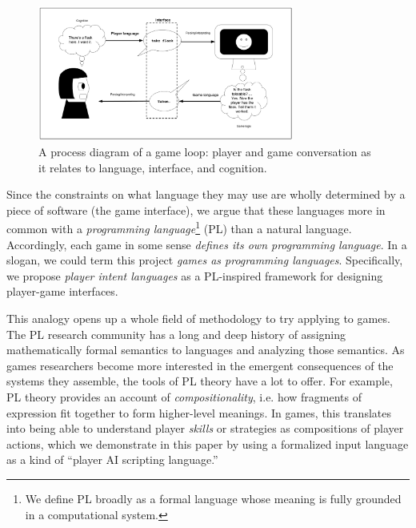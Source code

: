 \documentclass[sigconf]{acmart}
\begin{document}
\begin{figure}
\includegraphics[width=0.75\textwidth]{conversation-processing.png}
\caption{A process diagram of a game loop: player and game conversation as
it relates to language, interface, and cognition.}
\label{fig:gameloop}
\end{figure}

Since the constraints on what
language they may use are wholly determined by a piece of software (the
game interface), we argue that these languages more in common with a {\em
programming language}\footnote{We define PL broadly as a formal language whose meaning
is fully grounded in a computational system.} (PL) than a natural language. 
Accordingly, each game in some sense {\em defines its own programming
language}. In a slogan, we could term this project {\em games as
programming languages}.
%
Specifically, we propose \emph{player intent languages} as a
PL-inspired framework for designing player-game interfaces.


This analogy opens up a whole field of methodology to try applying to
games.  The PL research community has a long and deep
history of assigning mathematically formal semantics to languages and
analyzing those semantics. As games researchers become more interested in
the emergent consequences of the systems they assemble, the tools of PL
theory have a lot to offer. For example, PL theory provides an account of
{\em compositionality}, i.e. how fragments of expression fit together to
form higher-level meanings. In games, this translates into being able to
understand player {\em skills} or strategies as compositions of player
actions, which we demonstrate in this paper by using a formalized input
language as a kind of ``player AI scripting language.''

\end{document}
